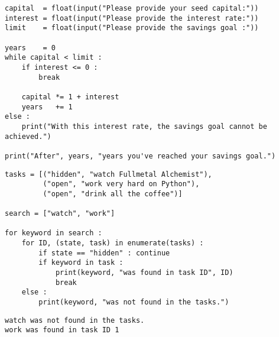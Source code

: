 
\begin{frame}[fragile]
%
\begin{codebox}
\begin{verbatim}
capital  = float(input("Please provide your seed capital:"))
interest = float(input("Please provide the interest rate:"))
limit    = float(input("Please provide the savings goal :"))

years    = 0
while capital < limit :
    if interest <= 0 :
        break
    
    capital *= 1 + interest
    years   += 1
else :
    print("With this interest rate, the savings goal cannot be achieved.")
  
print("After", years, "years you've reached your savings goal.")
\end{verbatim}
\end{codebox}
%
\end{frame}


\begin{frame}[fragile]
%
\begin{codebox}
\begin{verbatim}
tasks = [("hidden", "watch Fullmetal Alchemist"),
         ("open", "work very hard on Python"),
         ("open", "drink all the coffee")]
         
search = ["watch", "work"]

for keyword in search :
    for ID, (state, task) in enumerate(tasks) :
        if state == "hidden" : continue
        if keyword in task :
            print(keyword, "was found in task ID", ID)
            break
    else :
        print(keyword, "was not found in the tasks.")
\end{verbatim}
\end{codebox}
%
\begin{cmdbox}
\begin{verbatim}
watch was not found in the tasks.
work was found in task ID 1
\end{verbatim}
\end{cmdbox}
%
\end{frame}

